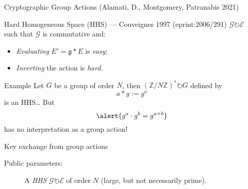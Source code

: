 \documentclass[aspectratio=169]{beamer}
\newcommand{\Z}{ℤ}
\renewcommand{\a}{{\mathfrak{a}}}
\renewcommand{\b}{{\mathfrak{b}}}
\newcommand{\g}{{\mathfrak{g}}}
\newcommand{\G}{{\mathcal{G}}}
\newcommand{\E}{{\mathcal{E}}}
\begin{document}
\begin{frame}{Cryptographic Group Actions \small(Alamati, D., Montgomery, Patranabis 2021)}
  \begin{block}{Hard Homogeneous Space (HHS) --- Couveignes 1997 \small(eprint:2006/291)}
    \emph{$\G\circlearrowright\E$} such that $\G$ is commutative and:
    \begin{itemize}
    \item \emph{Evaluating} $E' = \g*E$ is \emph{easy};
    \item \emph{Inverting} the action is \emph{hard}.
    \end{itemize}
  \end{block}

  \begin{block}{Example}
    Let $G$ be a group of order $N$, then \emph{$(\Z/N\Z)^* \circlearrowright G$} defined by
    \[a * g := g^a\]
    is an HHS\dots\pause
    But
    \[\alert{g^a \cdot g^b = g^{a+b}}\]
    has no interpretation as a group action!
  \end{block}
\end{frame}


\begin{frame}{Key exchange from group actions}
  \begin{description}
  \item[Public parameters:] A \emph{HHS $\G\circlearrowright \E$} of
    order $N$ (large, but not necessarily prime).
  \end{description}

  \bigskip
  
  \begin{center}
  \end{center}
\end{frame}

\end{document}
